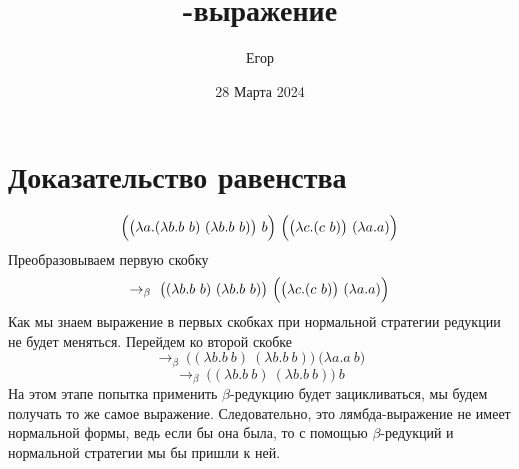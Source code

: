 \documentclass{article}
\title{\hugeЛямбда-выражение}
\author{\LARGEШишкарев Егор}
\date{\large28 Марта 2024}
\begin{document}
\maketitle
\section{Доказательство равенства}
\fontsize{14}{14}\selectfont
\begin{equation}
    \Bigl(\bigl(\lambda a.(\lambda b.b~b)~(\lambda b.b~b)\bigr)~b\Bigr)~\Bigl(\bigl(\lambda c.(c~b)\bigr)~(\lambda a.a)\Bigr)  
\end{equation}
Преобразовываем первую скобку
\begin{equation}
    \rightarrow_\beta~
    \bigl((\lambda b.b~b)~(\lambda b.b~b)\bigr)~\Bigl(\bigl(\lambda c.(c~b)\bigr)~(\lambda a.a)\Bigr) 
\end{equation}
Как мы знаем выражение в первых скобках при нормальной стратегии редукции не будет меняться. Перейдем ко второй скобке
\begin{equation}
    \rightarrow_\beta~
    \bigl((\lambda b.b~b)~(\lambda b.b~b)\bigr)~\bigl(\lambda a.a~b\bigr) 
\end{equation}
\begin{equation}
    \rightarrow_\beta~
    \bigl((\lambda b.b~b)~(\lambda b.b~b)\bigr)~b
\end{equation}
На этом этапе попытка применить $\beta$-редукцию будет зацикливаться, мы будем получать то же самое выражение. Следовательно, это лямбда-выражение не имеет нормальной формы, ведь если бы она была, то с помощью $\beta$-редукций и нормальной стратегии мы бы пришли к ней.
\end{document}
